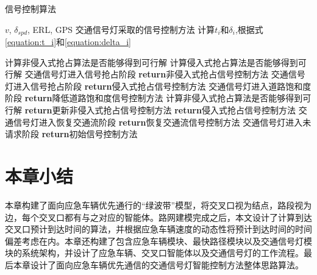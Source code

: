\begin{breakablealgorithm}
	\small
	\caption{信号控制算法} 
	\label{alg}
	\begin{algorithmic}[1]
		\REQUIRE ${v}$, ${\delta_{spd}}$, ERL, GPS
		\ENSURE 交通信号灯采取的信号控制方法
			\STATE 计算${t_i}$和${\delta_i}$,根据式\ref{equation:t_i}和\ref{equation:delta_i}
		
				\STATE 计算非侵入式抢占算法是否能够得到可行解
				\STATE 计算侵入式抢占算法是否能够得到可行解
					\STATE 交通信号灯进入信号抢占阶段
					\STATE \textbf{return}非侵入式抢占信号控制方法
					\STATE 交通信号灯进入信号抢占阶段
					\STATE \textbf{return}侵入式抢占信号控制方法
				\ELSE 
						\STATE 交通信号灯进入道路饱和度阶段
					\ENDIF
					\STATE \textbf{return}降低道路饱和度信号控制方法
				\ENDIF
						\STATE 计算非侵入式抢占算法是否能够得到可行解
							\STATE \textbf{return}更新非侵入式抢占信号控制方法
						\ELSE 
							\STATE \textbf{return}侵入式抢占信号控制方法
						\ENDIF
					\ENDIF
						\STATE 交通信号灯进入恢复交通流阶段
						\STATE \textbf{return}恢复交通流信号控制方法
					\ENDIF
				\ENDIF
			\ELSE
					\STATE 交通信号灯进入未请求阶段
					\STATE \textbf{return}初始信号控制方法
				\ENDIF
			\ENDIF
		\ENDWHILE
	\end{algorithmic}
\end{breakablealgorithm}

\section{本章小结}
本章构建了面向应急车辆优先通行的“绿波带”模型，将交叉口视为结点，路段视为边，每个交叉口都有与之对应的智能体。路网建模完成之后，本文设计了计算到达交叉口预计到达时间的算法，并根据应急车辆速度的动态性将预计到达时间的时间偏差考虑在内。本章还构建了包含应急车辆模块、最快路径模块以及交通信号灯模块的系统架构，并设计了应急车辆、交叉口智能体以及交通信号灯的工作流程。最后本章设计了面向应急车辆优先通信的交通信号灯智能控制方法整体思路算法。
